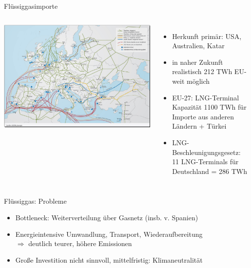 \documentclass[10pt]{beamer}
\begin{document}
\begin{frame}{Flüssiggasimporte}

\addtolength{\leftmargini}{\labelsep}

\begin{columns}
\includegraphics[width=\textwidth]{fig/gasnetz-europa.png}
\scriptsize{}
\small{
\begin{itemize}
\item Herkunft primär: USA, Australien, Katar\footnotemark
\item in naher Zukunft realistisch 212 TWh EU-weit möglich\footnotemark
\item EU-27: LNG-Terminal Kapazität 1100 TWh für Importe aus anderen Ländern\footnotemark
  + Türkei\footnotemark
\item LNG-Beschleunigungsgesetz: 11 LNG-Terminals für Deutschland = 286 TWh\footnotemark
\end{itemize}
}
\end{columns}
\smallskip
{}
\end{frame}


\begin{frame}{Flüssiggas: Probleme}
  \begin{itemize}
\item Bottleneck: Weiterverteilung über Gasnetz (insb. v. Spanien) 
\item Energieintensive Umwandlung, Transport, Wiederaufbereitung 
  \\ $\Rightarrow$ deutlich teurer, höhere Emissionen 
\item Große Investition nicht sinnvoll, mittelfristig: Klimaneutralität
  \end{itemize}
\end{frame}
\end{document}

